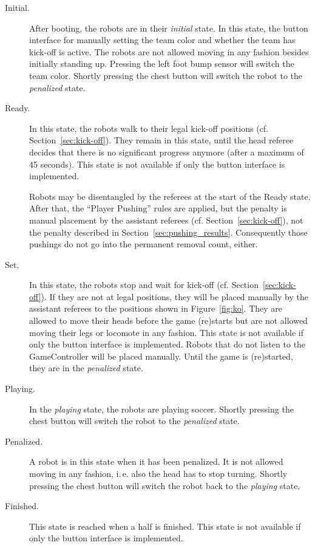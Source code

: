\documentclass[12pt]{article}
\newcommand{\ie}{\mbox{i.\,e.}\xspace}
\newcommand{\cf}{\mbox{cf.}\xspace}
\newcommand{\KickOffAutoTime}{45 seconds\xspace}
\begin{document}
\begin{description}

\item[Initial.] After booting, the robots are in their \emph{initial} state. In this state, the button interface for manually setting the team color and whether the team has kick-off is active. The robots are not allowed moving in any fashion besides initially standing up. Pressing the left foot bump sensor will switch the team color. Shortly pressing the chest button will switch the robot to the \emph{penalized} state.

\item[Ready.] In this state, the robots walk to their legal kick-off positions (\cf Section~\ref{sec:kick-off}). They remain in this state, until the head referee decides that there is no significant progress anymore (after a maximum of \KickOffAutoTime). This state is not available if only the button interface is implemented.

Robots may be disentangled by the referees at the start of the Ready state. After that, 
the ``Player Pushing'' rules are applied, but the penalty is manual placement by the assistant referees (\cf Section~\ref{sec:kick-off}), not the penalty described in Section~\ref{sec:pushing_results}.
Consequently those pushings do not go into the permanent removal count, either.

\item[Set.] In this state, the robots stop and wait for kick-off (\cf Section~\ref{sec:kick-off}). If they are not at legal positions, they will be placed manually by the assistant referees to the positions shown in Figure~\ref{fig:ko}. They are allowed to move their heads before the game (re)starts but are not allowed moving their legs or locomote in any fashion. This state is not available if only the button interface is implemented. Robots that do not listen to the GameController will be placed manually. Until the game is (re)started, they are in the \emph{penalized} state.

\item[Playing.] In the \emph{playing} state, the robots are playing soccer. Shortly pressing the chest button will switch the robot to the \emph{penalized} state.

\item[Penalized.] A robot is in this state when it has been penalized. It is not allowed moving in any fashion, \ie also the head has to stop turning. Shortly pressing the chest button will switch the robot back to the \emph{playing} state.

\item[Finished.] This state is reached when a half is finished. This state is not available if only the button interface is implemented.

\end{description}
\end{document}

